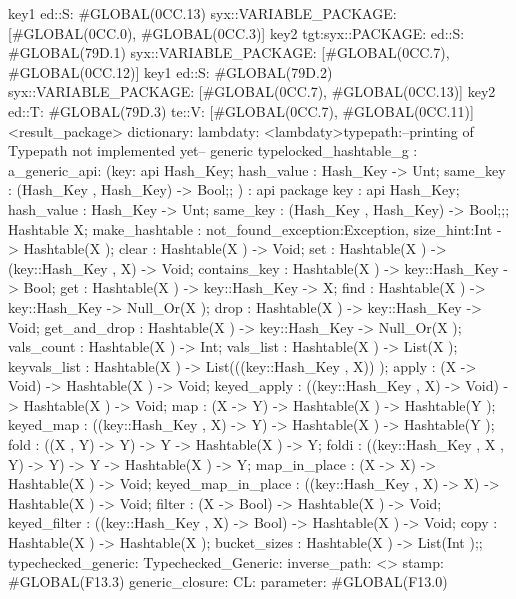                      key1
                    ed::S: #GLOBAL(0CC.13)
                     syx::VARIABLE_PACKAGE:
                     [#GLOBAL(0CC.0), #GLOBAL(0CC.3)]
                     key2
                tgt:syx::PACKAGE:
                    ed::S: #GLOBAL(79D.1)
                     syx::VARIABLE_PACKAGE:
                     [#GLOBAL(0CC.7), #GLOBAL(0CC.12)]
                     key1
                    ed::S: #GLOBAL(79D.2)
                     syx::VARIABLE_PACKAGE:
                     [#GLOBAL(0CC.7), #GLOBAL(0CC.13)]
                     key2
                    ed::T: #GLOBAL(79D.3)
                     te::V:
                     [#GLOBAL(0CC.7), #GLOBAL(0CC.11)]
         <result_package>
dictionary:
lambdaty:
  <lambdaty>typepath:--printing of Typepath not implemented yet--
generic typelocked_hashtable_g
:
a_generic_api:
(key:
api {
    Hash_Key;
    hash_value : Hash_Key -> Unt;
    same_key : (Hash_Key , Hash_Key) -> Bool;};
)
:
api {   package key
          : api {
                Hash_Key;
                hash_value : Hash_Key -> Unt;
                same_key : (Hash_Key , Hash_Key) -> Bool;};;
    Hashtable X;
    make_hashtable : {not_found_exception:Exception, size_hint:Int} -> Hashtable(X );
    clear : Hashtable(X ) -> Void;
    set : Hashtable(X ) -> (key::Hash_Key , X) -> Void;
    contains_key : Hashtable(X ) -> key::Hash_Key -> Bool;
    get : Hashtable(X ) -> key::Hash_Key -> X;
    find : Hashtable(X ) -> key::Hash_Key -> Null_Or(X );
    drop : Hashtable(X ) -> key::Hash_Key -> Void;
    get_and_drop : Hashtable(X ) -> key::Hash_Key -> Null_Or(X );
    vals_count : Hashtable(X ) -> Int;
    vals_list : Hashtable(X ) -> List(X );
    keyvals_list : Hashtable(X ) -> List(((key::Hash_Key , X)) );
    apply : (X -> Void) -> Hashtable(X ) -> Void;
    keyed_apply : ((key::Hash_Key , X) -> Void) -> Hashtable(X ) -> Void;
    map : (X -> Y) -> Hashtable(X ) -> Hashtable(Y );
    keyed_map : ((key::Hash_Key , X) -> Y) -> Hashtable(X ) -> Hashtable(Y );
    fold : ((X , Y) -> Y) -> Y -> Hashtable(X ) -> Y;
    foldi : ((key::Hash_Key , X , Y) -> Y) -> Y -> Hashtable(X ) -> Y;
    map_in_place : (X -> X) -> Hashtable(X ) -> Void;
    keyed_map_in_place : ((key::Hash_Key , X) -> X) -> Hashtable(X ) -> Void;
    filter : (X -> Bool) -> Hashtable(X ) -> Void;
    keyed_filter : ((key::Hash_Key , X) -> Bool) -> Hashtable(X ) -> Void;
    copy : Hashtable(X ) -> Hashtable(X );
    bucket_sizes : Hashtable(X ) -> List(Int );};
typechecked_generic:
Typechecked_Generic:
inverse_path: <>
stamp: #GLOBAL(F13.3)
generic_closure:
CL:
parameter: #GLOBAL(F13.0)
